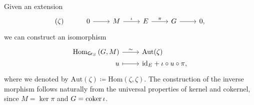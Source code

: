 \begin{rem}[]\label{rem:CorrExtAutMor}
	Given an extension
	\begin{equation*}
	\begin{tikzcd}
		(\zeta) &
		0 \arrow[r, "", rightarrow] &
		M \arrow[r, "\iota", rightarrow] &
		E \arrow[r, "\pi", rightarrow] &
		G \arrow[r, "", rightarrow] &
		0
	,\end{tikzcd}
	\end{equation*}
	we can construct an isomorphism
	\begin{equation*}
	\begin{tikzcd}[row sep = 0ex
		,/tikz/column 1/.append style={anchor=base east}
		,/tikz/column 2/.append style={anchor=base west}]
		\mathrm{Hom}_{\mathsf{Gr}_S} \left( G, M \right)
		\arrow[r, "\sim", rightarrow] &
		\mathrm{Aut}(\zeta) \\
		u \arrow[r, "", mapsto] & 
		\mathrm{id}_{ E } + \iota \circ u \circ \pi
	,\end{tikzcd}
	\end{equation*} 
	where we denoted by $\mathrm{Aut}(\zeta) \coloneqq \mathrm{Hom} \left( \zeta, \zeta \right)$.
	The construction of the inverse morphism follows naturally from the 
	universal properties of kernel and cokernel, since $M = \ker \pi$
	and $G = \operatorname{coker} \iota$.
\end{rem}


